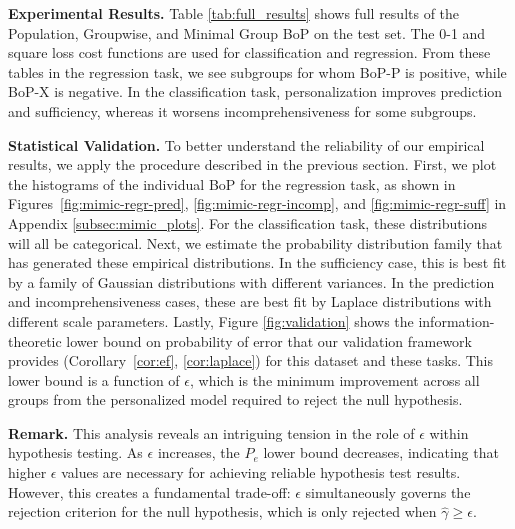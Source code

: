 \newpage
\textbf{Experimental Results.} Table \ref{tab:full_results} shows full results of the Population, Groupwise, and Minimal Group BoP on the test set. The 0-1 and square loss cost functions are used for classification and regression. From these tables in the regression task, we see subgroups for whom BoP-P is positive, while BoP-X is negative. In the classification task, personalization improves prediction and sufficiency, whereas it worsens incomprehensiveness for some subgroups. 

\textbf{Statistical Validation.} To better understand the reliability of our empirical results, we apply the procedure described in the previous section.  First, we plot the histograms of the individual BoP for the regression task, as shown in Figures~\ref{fig:mimic-regr-pred}, \ref{fig:mimic-regr-incomp}, and \ref{fig:mimic-regr-suff} in Appendix \ref{subsec:mimic_plots}. For the classification task, these distributions will all be categorical. Next, we estimate the probability distribution family that has generated these empirical distributions. In the sufficiency case, this is best fit by a family of Gaussian distributions with different variances. In the prediction and incomprehensiveness cases, these are best fit by Laplace distributions with different scale parameters. Lastly, Figure \ref{fig:validation} shows the information-theoretic lower bound on probability of error that our validation framework provides (Corollary~\ref{cor:ef}, \ref{cor:laplace}) for this dataset and these tasks. This lower bound is a function of $\epsilon$, which is the minimum improvement across all groups from the personalized model required to reject the null hypothesis.

\begin{tcolorbox}[
    colback=white,
    colframe=black,
    boxrule=0.5pt,
    left=5pt,
    right=5pt,
    top=5pt,
    bottom=5pt,
    boxsep=0pt,
    arc=10pt,
    outer arc=10pt
]
\textbf{Remark.} This analysis reveals an intriguing tension in the role of $\epsilon$ within hypothesis testing. As $\epsilon$ increases, the $P_e$ lower bound decreases, indicating that higher $\epsilon$ values are necessary for achieving reliable hypothesis test results. However, this creates a fundamental trade-off: $\epsilon$ simultaneously governs the rejection criterion for the null hypothesis, which is only rejected when $\hat{\gamma} \geq \epsilon$.
\end{tcolorbox}


